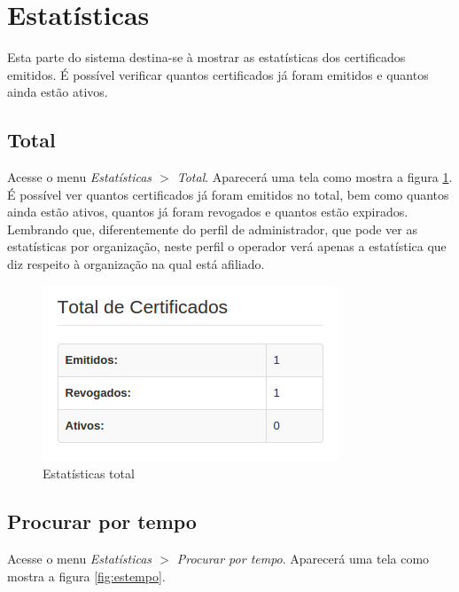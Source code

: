 \section{Estatísticas}

Esta parte do sistema destina-se à mostrar as estatísticas dos certificados emitidos. É possível verificar quantos certificados já foram emitidos e quantos ainda estão ativos.

\subsection{Total}

Acesse o menu \textit{Estatísticas $>$ Total}. Aparecerá uma tela como mostra a figura \ref{fig:estotalop}. É possível ver quantos certificados já foram emitidos no total, bem como quantos ainda estão ativos, quantos já foram revogados e quantos estão expirados. Lembrando que, diferentemente do perfil de administrador, que pode ver as estatísticas por organização, neste perfil o operador verá apenas a estatística que diz respeito à organização na qual está afiliado.

\begin{figure}[ht]
     \centering
     \includegraphics[scale=0.6]{images/estatisticaop.png}
     \caption{Estatísticas total}
     \label{fig:estotalop}
\end{figure}

\subsection{Procurar por tempo}

Acesse o menu \textit{Estatísticas $>$ Procurar por tempo}. Aparecerá uma tela como mostra a figura \ref{fig:estempo}.

